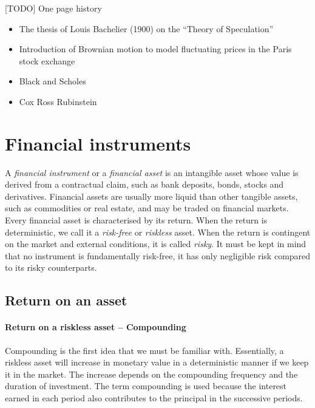 

[TODO] One page history
\begin{itemize}
	\item The thesis of Louis Bachelier (1900) on the ``Theory of Speculation''
	\item Introduction of Brownian motion to model fluctuating prices in the Paris stock exchange
	\item Black and Scholes
	\item Cox Ross Rubinstein
\end{itemize}



\section{Financial instruments}
\label{sec:intro-assets}

A \emph{financial instrument} or a \emph{financial asset} is an intangible asset whose value is derived from a contractual claim, such as bank deposits, bonds, stocks and derivatives. Financial assets are usually more liquid than other tangible assets, such as commodities or real estate, and may be traded on financial markets. Every financial asset is characterised by its return. When the return is deterministic, we call it a \emph{risk-free} or \emph{riskless} asset. When the return is contingent on the market and external conditions, it is called \emph{risky}. It must be kept in mind that no instrument is fundamentally risk-free, it has only negligible risk compared to its risky counterparts.



\subsection{Return on an asset}
\label{subsec:intro-assets-return}

\paragraph{Return on a riskless asset -- Compounding}
Compounding is the first idea that we must be familiar with. Essentially, a riskless asset will increase in monetary value in a deterministic manner if we keep it in the market. The increase depends on the compounding frequency and the duration of investment. The term compounding is used because the interest earned in each period also contributes to the principal in the successive periods.

